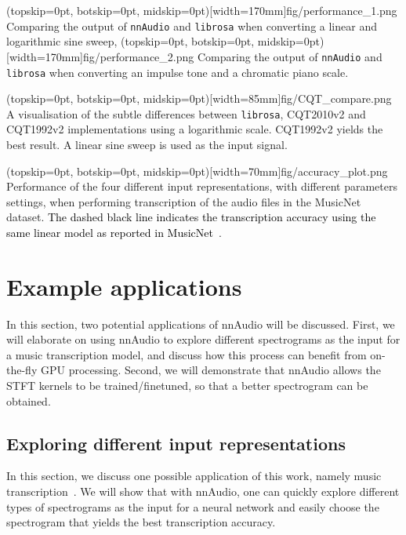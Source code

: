 \documentclass{ieeeaccess}
\newcommand{\nbh}[1]{\texttt{#1}}
\newcommand{\newtext}[1]{\textcolor{black}{#1}} %
\begin{document}
\Figure(topskip=0pt, botskip=0pt, midskip=0pt)[width=170mm]{fig/performance_1.png}
{Comparing the output of \nbh{nnAudio} and \nbh{librosa} when converting a linear and logarithmic sine sweep, \label{fig: performance_1}}
\Figure(topskip=0pt, botskip=0pt, midskip=0pt)[width=170mm]{fig/performance_2.png}
{Comparing the output of \nbh{nnAudio} and \nbh{librosa} when converting an impulse tone and a chromatic piano scale. \label{fig: performance_2}}



\Figure(topskip=0pt, botskip=0pt, midskip=0pt)[width=85mm]{fig/CQT_compare.png}
{A visualisation of the subtle differences between \nbh{librosa}, CQT2010v2 and CQT1992v2 implementations using a logarithmic scale. CQT1992v2 yields the best result. A linear sine sweep is used as the input signal.\label{fig: CQT_compare}}

\Figure(topskip=0pt, botskip=0pt, midskip=0pt)[width=70mm]{fig/accuracy_plot.png}
{Performance of the four different input representations, with different parameters settings, when performing transcription of the audio files in the MusicNet dataset. \newtext{The dashed black line indicates the transcription accuracy using the same linear model as reported in MusicNet}~\cite{thickstun2017learning, thickstun2018invariances}.  \label{fig: accuracy_plot}}


\section{Example applications}
In this section, two potential applications of nnAudio will be discussed. First, we will elaborate on using nnAudio to explore different spectrograms as the input for a music transcription model, and discuss how this process can benefit from on-the-fly GPU processing. Second, we will demonstrate that nnAudio allows the STFT kernels to be trained/finetuned, so that a better spectrogram can be obtained.


\subsection{Exploring different input representations}
\label{sec: eg1}
In this section, we discuss one possible application of this work, namely music transcription~\cite{benetos2013automatic, holzapfel2019automatic}. We will show that with nnAudio, one can quickly explore different types of spectrograms as the input for a neural network and easily choose the spectrogram that yields the best transcription accuracy.
\end{document}

